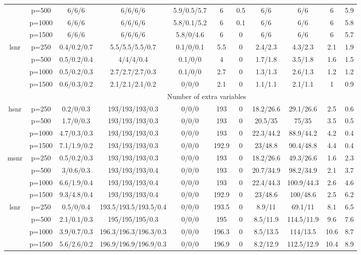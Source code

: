 \begin{table}[ht]
{\begin{tabular}{|c|c|ccccccccc|}
   & p=500 & 6/6/6 & 6/6/6/6 & 5.9/0.5/5.7 & 6 & 0.5 & 6/6 & 6/6 & 6 & 5.9 \\ 
   & p=1000 & 6/6/6 & 6/6/6/6 & 5.8/0.1/5.2 & 6 & 0.1 & 6/6 & 6/6 & 6 & 5.8 \\ 
   & p=1500 & 6/6/6 & 6/6/6/6 & 5.8/0/4.6 & 6 & 0 & 6/6 & 6/6 & 6 & 5.7 \\ 
  \midrule\multirow{4}[2]{*}{lsnr} & p=250 & 0.4/0.2/0.7 & 5.5/5.5/5.5/0.7 & 0.1/0/0.1 & 5.5 & 0 & 2.4/2.3 & 4.3/2.3 & 2.1 & 1.9 \\ 
   & p=500 & 0.5/0.2/0.4 & 4/4/4/0.4 & 0.1/0/0 & 4 & 0 & 1.7/1.8 & 3.5/1.8 & 1.6 & 1.5 \\ 
   & p=1000 & 0.5/0.2/0.3 & 2.7/2.7/2.7/0.3 & 0.1/0/0 & 2.7 & 0 & 1.3/1.3 & 2.6/1.3 & 1.2 & 1.2 \\ 
   & p=1500 & 0.6/0.3/0.2 & 2.1/2.1/2.1/0.2 & 0/0/0 & 2.1 & 0 & 1.1/1.1 & 2.1/1.1 & 1 & 0.9 \\ 
   \midrule 
 \multicolumn{1}{|c}{} &       & \multicolumn{9}{c|}{Number of extra variables} \\
\midrule\multirow{4}[2]{*}{hsnr} & p=250 & 0.2/0/0.3 & 193/193/193/0.3 & 0/0/0 & 193 & 0 & 18.2/26.6 & 29.1/26.6 & 2.5 & 0.6 \\ 
   & p=500 & 1.7/0/0.3 & 193/193/193/0.3 & 0/0/0 & 193 & 0 & 20.5/35 & 75/35 & 3.5 & 0.5 \\ 
   & p=1000 & 4.7/0.3/0.3 & 193/193/193/0.3 & 0/0/0 & 193 & 0 & 22.3/44.2 & 88.9/44.2 & 4.2 & 0.4 \\ 
   & p=1500 & 7.1/1.9/0.2 & 193/193/193/0.3 & 0/0/0 & 192.9 & 0 & 23/48.8 & 90.4/48.8 & 4.4 & 0.4 \\ 
  \midrule\multirow{4}[2]{*}{msnr} & p=250 & 0.5/0.2/0.3 & 193/193/193/0.3 & 0/0/0 & 193 & 0 & 18.2/26.6 & 49.3/26.6 & 1.6 & 2.3 \\ 
   & p=500 & 3/0.6/0.3 & 193/193/193/0.4 & 0/0/0 & 193 & 0 & 20.7/34.9 & 98.2/34.9 & 2.1 & 3.7 \\ 
   & p=1000 & 6.6/1.9/0.4 & 193/193/193/0.4 & 0/0/0 & 193 & 0 & 22.4/44.3 & 100.9/44.3 & 2.6 & 4.6 \\ 
   & p=1500 & 9.3/4.8/0.4 & 193/193/193/0.4 & 0/0/0 & 192.9 & 0 & 23/48.6 & 100/48.6 & 2.5 & 6.2 \\ 
  \midrule\multirow{4}[2]{*}{lsnr} & p=250 & 0.5/0/0.4 & 193.5/193.5/193.5/0.4 & 0/0/0 & 193.5 & 0 & 8.9/11 & 69.1/11 & 8.1 & 6.5 \\ 
   & p=500 & 2.1/0.1/0.3 & 195/195/195/0.3 & 0/0/0 & 195 & 0 & 8.5/11.9 & 114.5/11.9 & 9.6 & 7.6 \\ 
   & p=1000 & 3.9/0.7/0.3 & 196.3/196.3/196.3/0.3 & 0/0/0 & 196.3 & 0 & 8.5/13.5 & 114/13.5 & 10.6 & 8.7 \\ 
   & p=1500 & 5.6/2.6/0.2 & 196.9/196.9/196.9/0.3 & 0/0/0 & 196.9 & 0 & 8.2/12.9 & 112.5/12.9 & 10.4 & 8.9 \\ 
   \bottomrule 
\end{tabular}
}
\end{table}
